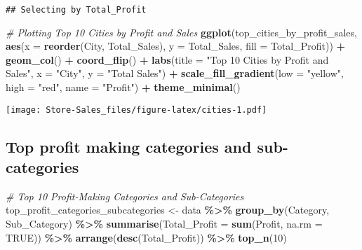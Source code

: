\documentclass[
]{article}
\newenvironment{Shaded}{\begin{snugshade}}{\end{snugshade}}
\newcommand{\AttributeTok}[1]{\textcolor[rgb]{0.13,0.29,0.53}{#1}}
\newcommand{\CommentTok}[1]{\textcolor[rgb]{0.56,0.35,0.01}{\textit{#1}}}
\newcommand{\ConstantTok}[1]{\textcolor[rgb]{0.56,0.35,0.01}{#1}}
\newcommand{\DecValTok}[1]{\textcolor[rgb]{0.00,0.00,0.81}{#1}}
\newcommand{\FunctionTok}[1]{\textcolor[rgb]{0.13,0.29,0.53}{\textbf{#1}}}
\newcommand{\NormalTok}[1]{#1}
\newcommand{\OtherTok}[1]{\textcolor[rgb]{0.56,0.35,0.01}{#1}}
\newcommand{\SpecialCharTok}[1]{\textcolor[rgb]{0.81,0.36,0.00}{\textbf{#1}}}
\newcommand{\StringTok}[1]{\textcolor[rgb]{0.31,0.60,0.02}{#1}}
\begin{document}
\begin{verbatim}
## Selecting by Total_Profit
\end{verbatim}

\begin{Shaded}
\begin{Highlighting}[]
\CommentTok{\# Plotting Top 10 Cities by Profit and Sales}
\FunctionTok{ggplot}\NormalTok{(top\_cities\_by\_profit\_sales, }\FunctionTok{aes}\NormalTok{(}\AttributeTok{x =} \FunctionTok{reorder}\NormalTok{(City, Total\_Sales), }\AttributeTok{y =}\NormalTok{ Total\_Sales, }\AttributeTok{fill =}\NormalTok{ Total\_Profit)) }\SpecialCharTok{+}
  \FunctionTok{geom\_col}\NormalTok{() }\SpecialCharTok{+}
  \FunctionTok{coord\_flip}\NormalTok{() }\SpecialCharTok{+}
  \FunctionTok{labs}\NormalTok{(}\AttributeTok{title =} \StringTok{"Top 10 Cities by Profit and Sales"}\NormalTok{, }\AttributeTok{x =} \StringTok{"City"}\NormalTok{, }\AttributeTok{y =} \StringTok{"Total Sales"}\NormalTok{) }\SpecialCharTok{+}
  \FunctionTok{scale\_fill\_gradient}\NormalTok{(}\AttributeTok{low =} \StringTok{"yellow"}\NormalTok{, }\AttributeTok{high =} \StringTok{"red"}\NormalTok{, }\AttributeTok{name =} \StringTok{"Profit"}\NormalTok{) }\SpecialCharTok{+}
  \FunctionTok{theme\_minimal}\NormalTok{()}
\end{Highlighting}
\end{Shaded}

\texttt{[image: Store-Sales\_files/figure-latex/cities-1.pdf]}

\hypertarget{top-profit-making-categories-and-sub-categories}{%
\subsection{Top profit making categories and
sub-categories}\label{top-profit-making-categories-and-sub-categories}}

\begin{Shaded}
\begin{Highlighting}[]
\CommentTok{\# Top 10 Profit{-}Making Categories and Sub{-}Categories}
\NormalTok{top\_profit\_categories\_subcategories }\OtherTok{\textless{}{-}}\NormalTok{ data }\SpecialCharTok{\%\textgreater{}\%}
  \FunctionTok{group\_by}\NormalTok{(Category, Sub\_Category) }\SpecialCharTok{\%\textgreater{}\%}
  \FunctionTok{summarise}\NormalTok{(}\AttributeTok{Total\_Profit =} \FunctionTok{sum}\NormalTok{(Profit, }\AttributeTok{na.rm =} \ConstantTok{TRUE}\NormalTok{)) }\SpecialCharTok{\%\textgreater{}\%}
  \FunctionTok{arrange}\NormalTok{(}\FunctionTok{desc}\NormalTok{(Total\_Profit)) }\SpecialCharTok{\%\textgreater{}\%}
  \FunctionTok{top\_n}\NormalTok{(}\DecValTok{10}\NormalTok{)}
\end{Highlighting}
\end{Shaded}
\end{document}
